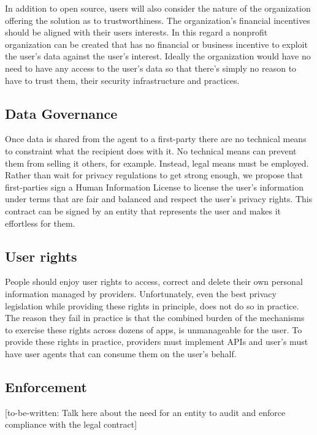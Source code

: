 \documentclass[11pt, oneside]{article}   	%
\begin{document}
In addition to open source, users will also consider the nature of the organization offering the solution as to trustworthiness. The organization's financial incentives should be aligned with their users interests. In this regard a nonprofit organization can be created that has no financial or business incentive to exploit the user's data against the user's interest. Ideally the organization would have no need to have any access to the user's data so that there's simply no reason to have to trust them, their security infrastructure and practices.

\subsection{Data Governance}

Once data is shared from the agent to a first-party there are no technical means to constraint what the recipient does with it. No technical means can prevent them from selling it others, for example. Instead, legal means must be employed. Rather than wait for privacy regulations to get strong enough, we propose that first-parties sign a Human Information License to license the user's information under terms that are fair and balanced and respect the user's privacy rights. This contract can be signed by an entity that represents the user and makes it effortless for them.

\subsection{User rights}

People should enjoy user rights to access, correct and delete their own personal information managed by providers. Unfortunately, even the best privacy legislation while providing these rights in principle, does not do so in practice. The reason they fail in practice is that the combined burden of the mechanisms to exercise these rights across dozens of apps, is unmanageable for the user. To provide these rights in practice, providers must implement APIs and user's must have user agents that can consume them on the user's behalf.

\subsection{Enforcement}

[to-be-written: Talk here about the need for an entity to audit and enforce compliance with the legal contract]
\end{document}
